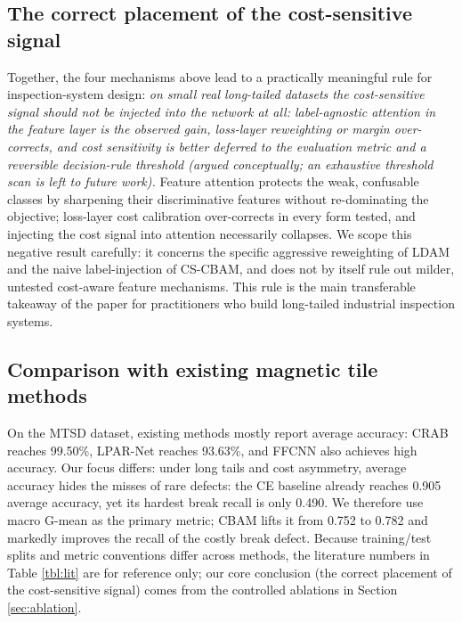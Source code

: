 \documentclass[a4paper,fleqn]{cas-sc}
\begin{document}
\begin{sloppypar}
	\subsection{The correct placement of the cost-sensitive signal}
	\par{
		Together, the four mechanisms above lead to a practically meaningful rule for inspection-system design: \emph{on small real long-tailed datasets the cost-sensitive signal should not be injected into the network at all: label-agnostic attention in the feature layer is the observed gain, loss-layer reweighting or margin over-corrects, and cost sensitivity is better deferred to the evaluation metric and a reversible decision-rule threshold (argued conceptually; an exhaustive threshold scan is left to future work).} Feature attention protects the weak, confusable classes by sharpening their discriminative features without re-dominating the objective; loss-layer cost calibration over-corrects in every form tested, and injecting the cost signal into attention necessarily collapses. We scope this negative result carefully: it concerns the specific aggressive reweighting of LDAM and the naive label-injection of CS-CBAM, and does not by itself rule out milder, untested cost-aware feature mechanisms. This rule is the main transferable takeaway of the paper for practitioners who build long-tailed industrial inspection systems.
	}

	\subsection{Comparison with existing magnetic tile methods}
	\par{
		On the MTSD dataset, existing methods mostly report average accuracy: CRAB \citep{li2024attention} reaches 99.50\%, LPAR-Net \citep{lv2024lightweight} reaches 93.63\%, and FFCNN \citep{xie2021ffcnn} also achieves high accuracy. Our focus differs: under long tails and cost asymmetry, average accuracy hides the misses of rare defects: the CE baseline already reaches 0.905 average accuracy, yet its hardest break recall is only 0.490. We therefore use macro G-mean as the primary metric; CBAM lifts it from 0.752 to 0.782 and markedly improves the recall of the costly break defect. Because training/test splits and metric conventions differ across methods, the literature numbers in Table \ref{tbl:lit} are for reference only; our core conclusion (the correct placement of the cost-sensitive signal) comes from the controlled ablations in Section \ref{sec:ablation}.
	}


\end{sloppypar}
\end{document}
